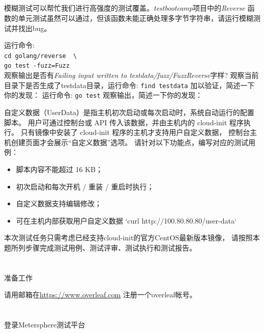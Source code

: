\documentclass[12pt,addpoints,fleqn]{exam}
\begin{document}
\begin{questions}
\begin{parts}
  \part{}模糊测试可以帮忙我们进行高强度的测试覆盖。\emph{testbootcamp}项目中的\emph{Reverse}
  函数的单元测试虽然可以通过，但该函数未能正确处理多字节字符串，请运行模糊测试并找出bug。
  \begin{subparts}
    \subpart{}运行命令: \\
      \verb|cd golang/reverse  \| \\
      \verb|go test -fuzz=Fuzz| \\
    \subpart{}观察输出是否有\emph{Failing input written to
      testdata/fuzz/FuzzReverse}字样?
    \fillwithdottedlines{1cm}
    \subpart{}观察当前目录下是否生成了testdata目录，运行命令: \verb|find testdata| 加以验证，简述一下你的发现：
    \fillwithdottedlines{1in}
    \subpart{}运行命令: \verb|go test| 观察输出，简述一下你的发现：
    \fillwithdottedlines{1in}
  \end{subparts}

\end{parts}

\newpage
\question[40] 
自定义数据（UserData）是指主机初次启动或每次启动时，系统自动运行的配置脚本。
用户可通过控制台或 API 传入该数据，并由主机内的 cloud-init 程序执行。
只有镜像中安装了 cloud-init 程序的主机才支持用户自定义数据，
控制台主机创建页面才会展示“自定义数据”选项。
请针对以下功能点，编写对应的测试用例：

\begin{itemize}
  \item 脚本内容不能超过 16 KB；
  \item 初次启动和每次开机 / 重装 / 重启时执行；
  \item 自定义数据支持编辑修改；
  \item 可在主机内部获取用户自定义数据 `curl http://100.80.80.80/user-data`
\end{itemize}
本次测试任务只需考虑已经支持cloud-init的官方CentOS最新版本镜像，
请按照本题所列步骤完成测试用例、测试评审、测试执行和测试报告。

\begin{parts}
  \part{}准备工作

  请用邮箱在\href{https://www.overleaf.com}{https://www.overleaf.com} 注册一个overleaf帐号。
  
  \part{}登录Metersphere测试平台


\end{parts}
\end{questions}
\end{document}
